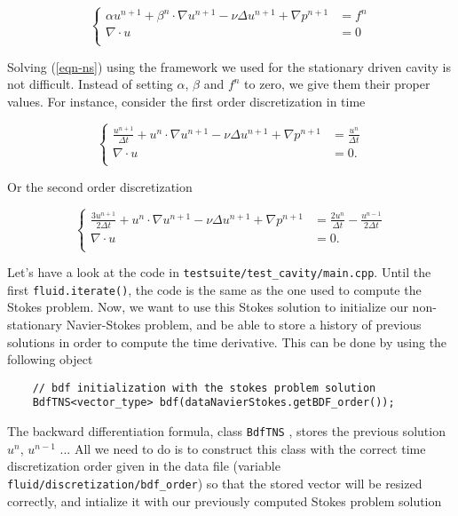 \begin{equation*} \label{eqn-ns}
\left\{
\begin{array}{rl}
\displaystyle \alpha u^{n+1} + \beta^n \cdot \nabla u^{n+1} - \nu \Delta u^{n+1}+
\nabla p^{n+1} & = f^n  \\
\displaystyle \nabla \cdot u & = 0  \\
\end{array}
\right.
\end{equation*}

Solving (\ref{eqn-ns}) using the framework we used for the stationary driven cavity is not difficult.
Instead of setting $\alpha$, $\beta$ and $f^n$ to zero, we give them their proper values. For instance,
consider the first order discretization in time

\begin{equation*} \label{eqn-nso1}
\left\{
\begin{array}{rl}
\displaystyle \frac {u^{n+1}}{\Delta t} + u^n \cdot \nabla u^{n+1} - \nu \Delta u^{n+1}+
\nabla p^{n+1} & = \displaystyle \frac{u^n}{\Delta t}  \\
\displaystyle \nabla \cdot u & = 0. \\
\end{array}
\right.
\end{equation*}

Or the second order discretization 

\begin{equation*} \label{eqn-nso2}
\left\{
\begin{array}{rl}
\displaystyle \frac {3u^{n+1}}{2\Delta t} + u^n \cdot \nabla u^{n+1} - \nu \Delta u^{n+1}+
\nabla p^{n+1} & = \displaystyle \frac{2u^n}{\Delta t} - \frac{u^{n-1}}{2\Delta t}  \\
\displaystyle \nabla \cdot u & = 0. \\
\end{array}
\right.
\end{equation*}

Let's have a look at the code in \verb!testsuite/test_cavity/main.cpp!.
Until the first \verb!fluid.iterate()!, the code is the same as the one used to compute the Stokes problem.
Now, we want to use this Stokes solution to initialize our non-stationary Navier-Stokes problem, and be able
to store a history of previous solutions in order to compute the time derivative.
This can be done by using the following object 
\begin{verbatim}
    // bdf initialization with the stokes problem solution
    BdfTNS<vector_type> bdf(dataNavierStokes.getBDF_order());
\end{verbatim}
The backward differentiation formula, class \verb!BdfTNS! , 
stores the previous solution $u^n$, $u^{n-1}$ ... 
All we need to do is to construct this class
with the correct time discretization order given in the data file (variable \verb!fluid/discretization/bdf_order!) 
so that the stored vector will be resized correctly, and intialize it with our previously computed Stokes problem solution

